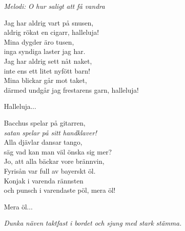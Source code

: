 {\footnotesize\textit{Melodi: O hur saligt att få vandra}}\par
\vspace{10pt}
Jag har aldrig vart på snusen,\\
aldrig rökat en cigarr, halleluja!\\
Mina dygder äro tusen,\\
inga syndiga laster jag har.\\
Jag har aldrig sett nåt naket,\\
inte ens ett litet nyfött barn!\\
Mina blickar går mot taket,\\
därmed undgår jag frestarens garn, halleluja!\par
\vspace{10pt}
Halleluja...\par
\vspace{10pt}
Bacchus spelar på gitarren,\\
\textit{satan spelar på sitt handklaver!}\\
Alla djävlar dansar tango,\\
säg vad kan man väl önska sig mer?\\
Jo, att alla bäckar vore brännvin,\\
Fyrisån var full av bayerskt öl.\\
Konjak i varenda rännsten\\
och punsch i varendaste pöl, mera öl!\par
\vspace{10pt}
Mera öl...\par
\vspace{10pt}
{\footnotesize\textit{Dunka näven taktfast i bordet och sjung med stark stämma.}}
